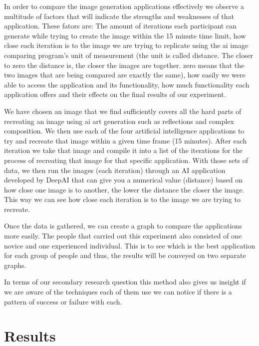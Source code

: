\documentclass[]{report}
\begin{document}
	In order to compare the image generation applications effectively we observe a multitude of factors that will indicate the strengths and weaknesses of that application. These fators are: The amount of iterations each participant can generate while trying to create the image within the 15 minute time limit, how close each iteration is to the image we are trying to replicate using the ai image comparing program's unit of measurement (the unit is called distance. The closer to zero the distance is, the closer the images are together. zero means that the two images that are being compared are exactly the same), how easily we were able to access the application and its functionality, how much functionality each application offers and their effects on the final results of our experiment.
	
	
	We have chosen an image that we find sufficiently covers all the hard parts of recreating an image using ai art generation such as reflections and complex composition. We then use each of the four artificial intelligence applications to try and recreate that image within a given time frame (15 minutes). After each iteration we take that image and compile it into a list of the iterations for the process of recreating that image for that specific application. With those sets of data, we then run the images (each iteration) through an AI application developed by DeepAI that can give you a numerical value (distance) based on how close one image is to another, the lower the distance the closer the image. This way we can see how close each iteration is to the image we are trying to recreate.
	
	Once the data is gathered, we can create a graph to compare the applications more easily. The people that carried out this experiment also consisted of one novice and one experienced individual. This is to see which is the best application for each group of people and thus, the results will be conveyed on two separate graphs.
	
	In terms of our secondary research question this method also gives us insight if we are aware of the techniques each of them use we can notice if there is a pattern of success or failure with each.
	
	
	
	\section{Results}

	\newpage
    
\end{document}

